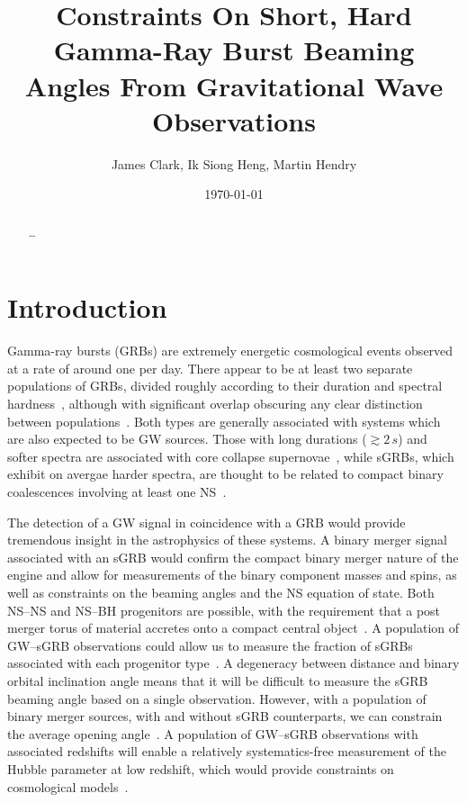 \documentclass[twocolumn,nofootinbib]{revtex4-1}
\newcommand{\BNS}{\ac{NS}--\ac{NS}\xspace}
\newcommand{\NSBH}{\ac{NS}--\ac{BH}\xspace}
\newcommand{\JOINT}{\ac{GW}--\ac{sGRB}\xspace}
\begin{document}
\title{Constraints On Short, Hard Gamma-Ray Burst Beaming Angles From
Gravitational Wave Observations}
\author{James Clark, Ik Siong Heng, Martin Hendry}
\date{\today}

\begin{abstract}
\dots
\end{abstract}

\maketitle

\section{Introduction}
Gamma-ray bursts (GRBs) are extremely energetic
cosmological events observed at a rate of around one per day.  There
appear to be at least two separate populations of \acp{GRB}, divided
roughly according to their duration and spectral
hardness~\cite{Kouveliotou:1993yx}, although with significant overlap
obscuring any clear distinction between
populations~\cite{Zhang:2009uf,Bromberg:2012gp}.  Both types are
generally associated with systems which are also expected to be
\ac{GW} sources.  Those with long durations ($\gtrsim 2\,s$) and
softer spectra are associated with core collapse
supernovae~\cite{Galama:1998ea,MacFadyen:1998vz,Woosley:2006fn}, while
\acp{sGRB}, which exhibit on avergae harder spectra, are thought to be
related to compact binary coalescences involving at least one
\ac{NS}~\cite{Eichler:1989ve,Paczynski:1991aq,Narayan:1992iy,Lee:2007js}.

The detection of a \ac{GW} signal in coincidence with a \ac{GRB} would
provide tremendous insight in the astrophysics of these systems.  A
binary merger signal associated with an \ac{sGRB} would confirm the
compact binary merger nature of the engine and allow for measurements
of the binary component masses and spins, as well as constraints on
the beaming angles and the \ac{NS} equation of state.  Both \BNS and
\NSBH progenitors are possible, with the requirement that a post
merger torus of material accretes onto a compact central
object~\cite{Blandford:1977ds,Rosswog:2002rt,Giacomazzo:2012zt}.  A
population of \JOINT observations could allow us to measure the
fraction of \acp{sGRB} associated with each progenitor
type~\cite{Kreidberg:2012ud}.  A degeneracy between distance and
binary orbital inclination angle means that it will be difficult to
measure the \ac{sGRB} beaming angle based on a single observation.
However, with a population of binary merger sources, with and without
\ac{sGRB} counterparts, we can constrain the average opening
angle~\cite{Clark:2014jpa}.  A population of \JOINT observations with
associated redshifts will enable a relatively systematics-free
measurement of the Hubble parameter at low redshift, which would
provide constraints on cosmological
models~\cite{Schutz:1986gp,Chen:2012qh}.
\end{document}
